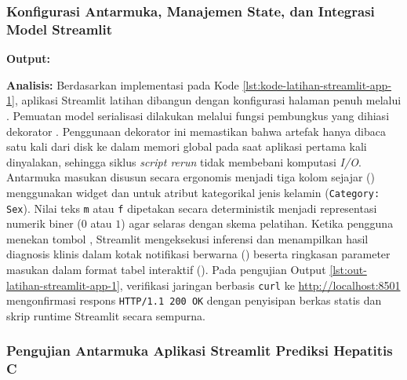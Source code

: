 \documentclass[a4paper,oneside,11pt]{book}
\begin{document}
\subsubsection{Konfigurasi Antarmuka, Manajemen State, dan Integrasi Model Streamlit}

\par \textbf{Output:}

\par \textbf{Analisis:} Berdasarkan implementasi pada Kode \ref{lst:kode-latihan-streamlit-app-1}, aplikasi Streamlit latihan dibangun dengan konfigurasi halaman penuh melalui . Pemuatan model serialisasi dilakukan melalui fungsi pembungkus  yang dihiasi dekorator . Penggunaan dekorator ini memastikan bahwa artefak  hanya dibaca satu kali dari disk ke dalam memori global pada saat aplikasi pertama kali dinyalakan, sehingga siklus \textit{script rerun} tidak membebani komputasi \textit{I/O}. Antarmuka masukan disusun secara ergonomis menjadi tiga kolom sejajar () menggunakan widget  dan  untuk atribut kategorikal jenis kelamin (\texttt{Category: Sex}). Nilai teks \texttt{m} atau \texttt{f} dipetakan secara deterministik menjadi representasi numerik biner ($0$ atau $1$) agar selaras dengan skema pelatihan. Ketika pengguna menekan tombol , Streamlit mengeksekusi inferensi  dan menampilkan hasil diagnosis klinis dalam kotak notifikasi berwarna () beserta ringkasan parameter masukan dalam format tabel interaktif (). Pada pengujian Output \ref{lst:out-latihan-streamlit-app-1}, verifikasi jaringan berbasis \texttt{curl} ke \url{http://localhost:8501} mengonfirmasi respons \texttt{HTTP/1.1 200 OK} dengan penyisipan berkas statis dan skrip runtime Streamlit secara sempurna.

\subsubsection{Pengujian Antarmuka Aplikasi Streamlit Prediksi Hepatitis C}
\end{document}
